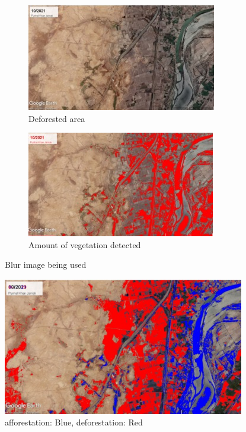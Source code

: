 \documentclass[12pt,a4paper,IEEEtran]{article}
\begin{document}
\begin{figure}[ht]
    \centering
    \begin{subfigure}{0.45\textwidth}
        \includegraphics[width=\linewidth]{fig2a.jpg} %
        \caption{Deforested area}
        \label{fig:subfig1}
    \end{subfigure}
    \hfill
    \begin{subfigure}{0.45\textwidth}
        \includegraphics[width=\linewidth]{fig2red.jpeg} %
        \caption{Amount of vegetation detected}
        \label{fig:subfig2}
    \end{subfigure}
    \caption{Blur image being used}
    \label{fig:overall}
\end{figure}

\begin{figure}[h]
    \centering
    \includegraphics[width=0.8\linewidth, height=6cm]{Figure 3.jpg} %
    \caption{afforestation: Blue, deforestation: Red}
    \label{fig:your_label}
\end{figure}
\end{document}
